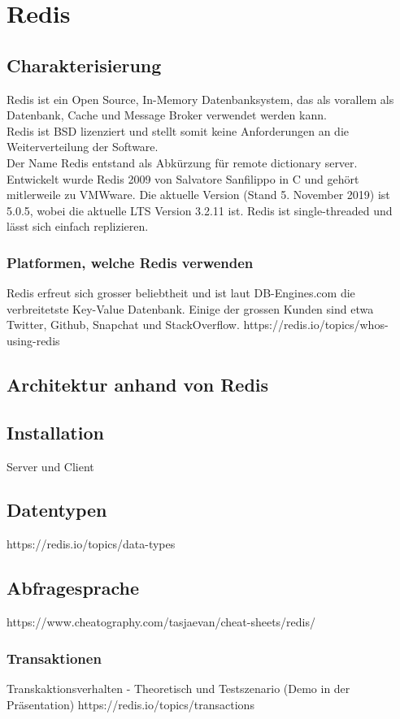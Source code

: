 \section{Redis}
\subsection{Charakterisierung}
Redis ist ein Open Source, In-Memory Datenbanksystem, das als vorallem als Datenbank, Cache und Message Broker verwendet werden kann.\\
Redis ist BSD lizenziert und stellt somit keine Anforderungen an die Weiterverteilung der Software.\\
Der Name Redis entstand als Abkürzung für remote dictionary server.\\
Entwickelt wurde Redis 2009 von Salvatore Sanfilippo in C und gehört mitlerweile zu VMWware. Die aktuelle Version (Stand 5. November 2019) ist 5.0.5, wobei die aktuelle LTS Version 3.2.11 ist.
Redis ist single-threaded und lässt sich einfach replizieren.

\subsubsection{Platformen, welche Redis verwenden}
Redis erfreut sich grosser beliebtheit und ist laut DB-Engines.com die verbreitetste Key-Value Datenbank.
Einige der grossen Kunden sind etwa Twitter, Github, Snapchat und StackOverflow.
https://redis.io/topics/whos-using-redis
\subsection{Architektur anhand von Redis}
\subsection{Installation}
Server und Client
\subsection{Datentypen}
https://redis.io/topics/data-types
\subsection{Abfragesprache}
https://www.cheatography.com/tasjaevan/cheat-sheets/redis/
\subsubsection{Transaktionen}
Transkaktionsverhalten - Theoretisch und Testszenario (Demo in der Präsentation)
https://redis.io/topics/transactions
